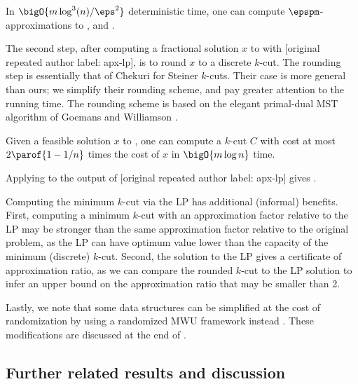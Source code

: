 \documentclass{toc}
\begin{document}
\begin{theorem}
  In $\bigO{m \log^3(n) / \eps^2}$ deterministic time, one can compute
  $\epspm$-approximations  %
  to ,  and
  .
\end{theorem}

The second step, after computing a fractional solution $x$ to
 with [original repeated author label: apx-lp], is to round $x$ to a
discrete $k$-cut. The rounding step is essentially that of Chekuri
\etal \cite{cgn-06} for Steiner $k$-cuts. Their case is more general
than ours; we simplify their rounding scheme, and pay greater
attention to the running time. The rounding scheme is based on the
elegant primal-dual MST algorithm of Goemans and Williamson
\cite{gw-95}.
\begin{theorem}
   Given a feasible solution $x$ to
  , one can compute a $k$-cut $C$ with cost at most
  $2 \parof{1 - 1/n}$ times the cost of $x$ in $\bigO{m \log n}$ time.
\end{theorem}

Applying  to the output of [original repeated author label: apx-lp]
gives .

Computing the minimum $k$-cut via the LP  has
additional (informal) benefits. First, computing a minimum $k$-cut
with an approximation factor relative to the LP may be stronger than
the same approximation factor relative to the original problem, as the
LP can have optimum value lower than the capacity of the minimum
(discrete) $k$-cut. Second, the solution to the LP gives a certificate
of approximation ratio, as we can compare the rounded $k$-cut to the
LP solution to infer an upper bound on the approximation ratio that
may be smaller than 2.

Lastly, we note that some data structures can be simplified at the
cost of randomization by using a randomized MWU framework instead
\cite{cq-18-soda}. These modifications are discussed at the end of
.

\subsection{Further related results and discussion}
\end{document}
